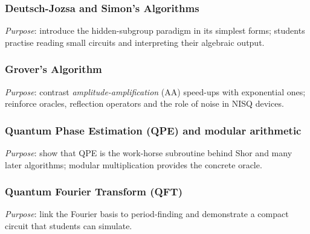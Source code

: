 \subsubsection{Deutsch-Jozsa and Simon's Algorithms}

\emph{Purpose}: introduce the hidden-subgroup paradigm in its simplest forms; 
students practise reading small circuits and interpreting their algebraic output.


\subsubsection{Grover's Algorithm}

\emph{Purpose}: contrast \emph{amplitude-amplification} (AA) speed-ups with exponential ones; 
reinforce oracles, reflection operators and the role of noise in NISQ devices.



\subsubsection{Quantum Phase Estimation (QPE) and modular arithmetic}

\emph{Purpose}: show that QPE is the work-horse subroutine behind Shor and many later algorithms; 
modular multiplication provides the concrete oracle.


\subsubsection{Quantum Fourier Transform (QFT)}

\emph{Purpose}: link the Fourier basis to period-finding 
and demonstrate a compact circuit that students can simulate.

